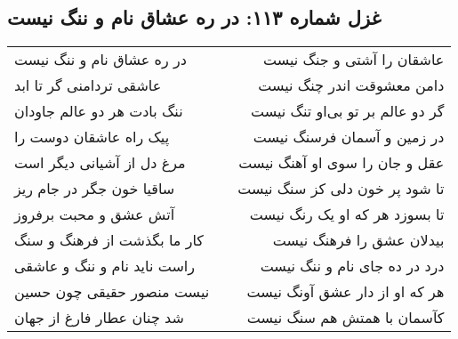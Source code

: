 \begin{center}
\section*{غزل شماره ۱۱۳: در ره عشاق نام و ننگ نیست}
\label{sec:113}
\begin{longtable}{l p{0.5cm} r}
در ره عشاق نام و ننگ نیست
&&
عاشقان را آشتی و جنگ نیست
\\
عاشقی تردامنی گر تا ابد
&&
دامن معشوقت اندر چنگ نیست
\\
ننگ بادت هر دو عالم جاودان
&&
گر دو عالم بر تو بی‌او تنگ نیست
\\
پیک راه عاشقان دوست را
&&
در زمین و آسمان فرسنگ نیست
\\
مرغ دل از آشیانی دیگر است
&&
عقل و جان را سوی او آهنگ نیست
\\
ساقیا خون جگر در جام ریز
&&
تا شود پر خون دلی کز سنگ نیست
\\
آتش عشق و محبت برفروز
&&
تا بسوزد هر که او یک رنگ نیست
\\
کار ما بگذشت از فرهنگ و سنگ
&&
بیدلان عشق را فرهنگ نیست
\\
راست ناید نام و ننگ و عاشقی
&&
درد در ده جای نام و ننگ نیست
\\
نیست منصور حقیقی چون حسین
&&
هر که او از دار عشق آونگ نیست
\\
شد چنان عطار فارغ از جهان
&&
کآسمان با همتش هم سنگ نیست
\\
\end{longtable}
\end{center}
